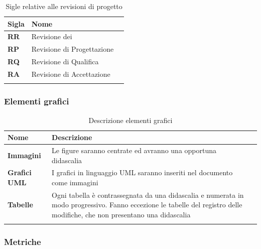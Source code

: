 {{		\setlength{\freewidth}{\dimexpr\textwidth-1\tabcolsep}
	\renewcommand{\arraystretch}{1.5}
	\setlength{\aboverulesep}{0pt}
	\setlength{\belowrulesep}{0pt}
	\begin{longtable}{L{.1\freewidth} L{.3\freewidth} L{.080\freewidth}}
		\textbf{Sigla} & \textbf{Nome} \\
		\toprule
		\endhead		
		 \textbf{RR}& Revisione dei  \\
		 \textbf{RP} & Revisione di Progettazione \\
		 \textbf{RQ} & Revisione di Qualifica \\
		 \textbf{RA} & Revisione di Accettazione \\
		 

		\bottomrule
		\hiderowcolors
		\caption{Sigle relative alle revisioni di progetto}
	\end{longtable}	
\subsubsection{Elementi grafici}

	\setlength{\freewidth}{\dimexpr\textwidth-1\tabcolsep}
	\renewcommand{\arraystretch}{1.5}
	\setlength{\aboverulesep}{0pt}
	\setlength{\belowrulesep}{0pt}
	\begin{longtable}{L{.2\freewidth} L{.6\freewidth} L{.080\freewidth}}
		\textbf{Nome} & \textbf{Descrizione} \\
		\toprule
		\endhead		
		 \textbf{Immagini} & Le figure saranno centrate ed avranno una opportuna didascalia \\
		  \textbf{Grafici UML} & I grafici in linguaggio UML saranno inseriti nel documento come immagini \\
		  \textbf{Tabelle} & Ogni tabella è contrassegnata da una didascalia e numerata in modo progressivo. Fanno eccezione le tabelle del registro delle modifiche, che non presentano una didascalia \\
		 

		\bottomrule
		\hiderowcolors
		\caption{Descrizione elementi grafici}
	\end{longtable}	

\subsubsection{Metriche}

}}
